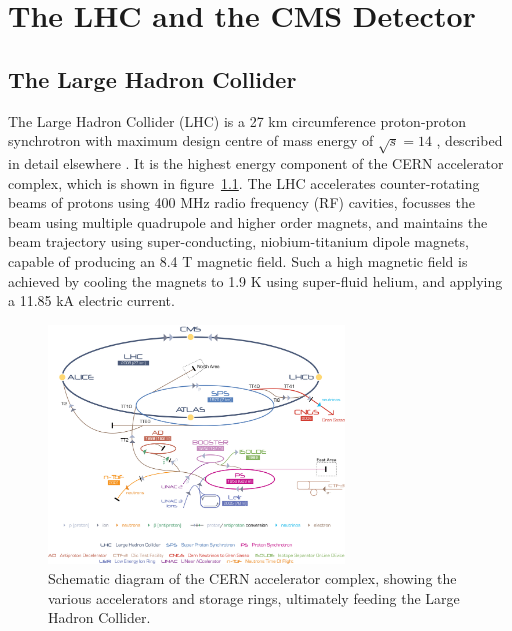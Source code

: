 \chapter{The LHC and the CMS Detector}
\label{ch:detector}

\ifpdf
    \graphicspath{{Chapter3/Figs/Raster/}{Chapter3/Figs/PDF/}{Chapter3/Figs/}}
\else
    \graphicspath{{Chapter3/Figs/Vector/}{Chapter3/Figs/}}
\fi


\section{The Large Hadron Collider}  %
\label{sec:detector_lhc}

The Large Hadron Collider (LHC) is a 27 km circumference proton-proton 
synchrotron with maximum design centre of mass energy of
$\sqrt{s} = 14$ \tev, described in detail elsewhere \cite{Evans:2008zzb}. It
is the highest energy component of the CERN accelerator
complex, which is shown in figure~\ref{fig:cern_acc_complex}. The LHC
accelerates counter-rotating beams of protons using 400 MHz radio frequency
(RF) cavities, focusses the beam using multiple quadrupole and higher order magnets,
and maintains the beam trajectory using super-conducting, niobium-titanium 
dipole magnets, capable of producing an 8.4 T magnetic field. Such a high 
magnetic field is achieved by cooling the magnets to 1.9 K using super-fluid 
helium, and applying a 11.85 kA electric current.


\begin{figure}[ht!]
\centering
\includegraphics[width=0.7\textwidth]{Figs/machine/Cern-Accelerator-Complex.jpg}
\caption{Schematic diagram of the CERN accelerator complex, showing the various 
accelerators and storage rings, ultimately feeding the Large Hadron Collider.}
\label{fig:cern_acc_complex}
\end{figure}

